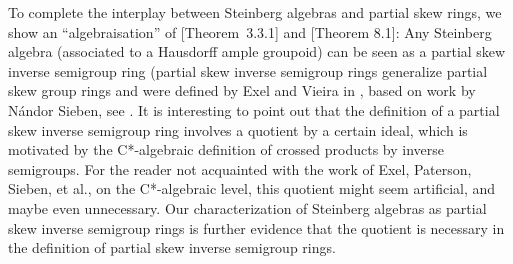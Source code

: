 \documentclass[11pt, a4paper]{amsart}
\newcommand{\G}{\ensuremath {\mathcal{G}}}
\newcommand{\Lg}{\ensuremath {\mathcal{L}_c(X)\rtimes_{\alpha} G}}
\theoremstyle{plain}
\begin{document}
To complete the interplay between Steinberg algebras and partial skew rings, we show an “algebraisation” of [Theorem~3.3.1]\cite{Paterson} and [Theorem 8.1]\cite{Quigg}: Any Steinberg algebra (associated to a Hausdorff ample groupoid) can be seen as a partial skew inverse semigroup ring (partial skew inverse semigroup rings generalize partial skew group rings and were defined by Exel and Vieira in \cite{Vieira}, based on work by Nándor Sieben, see \cite{Sieben}. It is interesting to point out that the definition of a partial skew inverse semigroup ring involves a quotient by a certain ideal, which is motivated by the C*-algebraic definition of crossed products by inverse semigroups. For the reader not acquainted with the work of Exel, Paterson, Sieben, et al., on the C*-algebraic level, this quotient might seem artificial, and maybe even unnecessary. Our characterization of Steinberg algebras as partial skew inverse semigroup rings is further evidence that the quotient is necessary in the definition of partial skew inverse semigroup rings.






 
\end{document}
